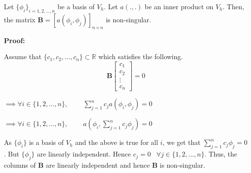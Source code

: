 \documentclass[12pt]{article}
\begin{document}
	Let $\{\phi_i\}_{i=1,2,...,n}$ be a basis of $V_h$. Let $a(.,.)$ be an inner product on $V_h$. Then, the matrix $\textbf{B}=[a(\phi_i,\phi_j)]_{n\times n}$ is non-singular.
	
	 \textbf{Proof:}
	 
	Assume that $\{c_1,c_2,...,c_n\}\subset \mathbb{R}$ which satisfies the following.
	$$\textbf{B}
	 \begin{bmatrix}
	c_1\\c_2\\\vdots\\c_n
	\end{bmatrix}=0$$
	
	$\implies \forall i \in \{1,2,...,n\},\;\;\;\;\;\;\;\; \sum\limits_{j=1}^n c_j a(\phi_i,\phi_j)=0 $
	
	$\implies \forall i \in \{1,2,...,n\},\;\;\;\;\;\;\;\; a(\phi_i,\sum\limits_{j=1}^n c_j\phi_j)=0 $
	
	As $\{\phi_i\}$ is a basis of $V_h$ and the above is true for all $i$, we get that $\sum_{j=1}^n c_j\phi_j=0$. But $\{\phi_j\}$ are linearly independent. Hence $c_j=0\;\;\;\forall j \in \{1,2,...,n\}$. Thus, the columns of $\textbf{B}$ are linearly independent and hence $\textbf{B}$ is non-singular.
	
\end{document}
